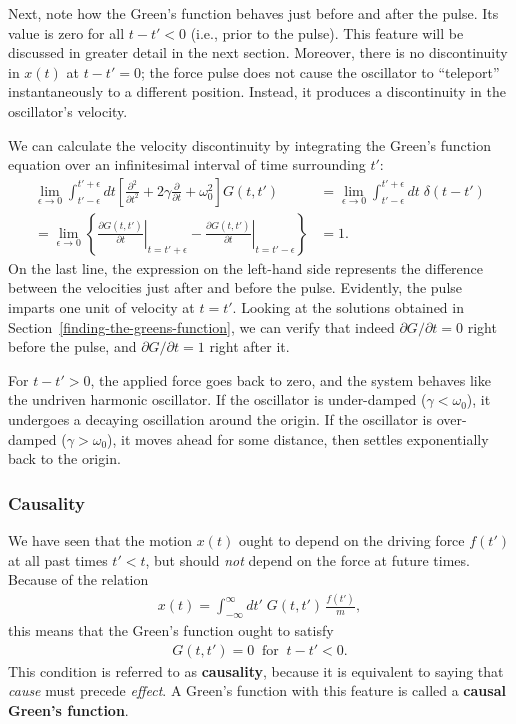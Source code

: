 \documentclass[10pt,a4paper]{article}
\begin{document}
Next, note how the Green's function behaves just before and after the
pulse. Its value is zero for all $t - t' < 0$ (i.e., prior to the
pulse). This feature will be discussed in greater detail in the next
section. Moreover, there is no discontinuity in $x(t)$ at $t - t' =
0$; the force pulse does not cause the oscillator to ``teleport''
instantaneously to a different position.  Instead, it produces a
discontinuity in the oscillator's velocity.

We can calculate the velocity discontinuity by integrating the Green's
function equation over an infinitesimal interval of time surrounding
$t'$:
\begin{align}
  \lim_{\epsilon \rightarrow 0} \int_{t'-\epsilon}^{t'+\epsilon} dt \left[\frac{\partial^2}{\partial t^2} + 2\gamma\frac{\partial}{\partial t} + \omega_0^2\right] G(t,t') &= \lim_{\epsilon \rightarrow 0} \int_{t'-\epsilon}^{t'+\epsilon} dt \; \delta(t-t') \\
  = \lim_{\epsilon \rightarrow 0} \left\{ \left.\frac{\partial G(t,t')}{\partial t}\right|_{t = t' +\epsilon} - \left.\frac{\partial G(t,t')}{\partial t}\right|_{t = t' - \epsilon}\right\} &= 1.
\end{align}
On the last line, the expression on the left-hand side represents the
difference between the velocities just after and before the
pulse. Evidently, the pulse imparts one unit of velocity at $t=t'$.
Looking at the solutions obtained in
Section~\ref{finding-the-greens-function}, we can verify that indeed
$\partial G/\partial t = 0$ right before the pulse, and $\partial
G/\partial t = 1$ right after it.

For $t - t' > 0$, the applied force goes back to zero, and the system
behaves like the undriven harmonic oscillator.  If the oscillator is
under-damped ($\gamma < \omega_0$), it undergoes a decaying
oscillation around the origin.  If the oscillator is over-damped
($\gamma > \omega_0$), it moves ahead for some distance, then settles
exponentially back to the origin.

\subsubsection{Causality}
\label{causality}

We have seen that the motion $x(t)$ ought to depend on the driving
force $f(t')$ at all past times $t' < t$, but should \textit{not}
depend on the force at future times.  Because of the relation
\begin{align}
  x(t) = \int_{-\infty}^\infty dt'\; G(t,t')\, \frac{f(t')}{m},
\end{align}
this means that the Green's function ought to satisfy
\begin{align}
  G(t,t') = 0 \;\; \mathrm{for}\;\; t -t' < 0.
\end{align}
This condition is referred to as \textbf{causality}, because it is
equivalent to saying that \textit{cause} must precede \textit{effect}.
A Green's function with this feature is called a \textbf{causal
  Green's function}.
\end{document}
